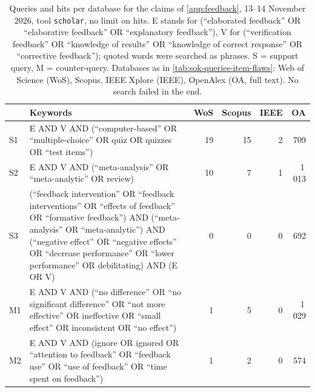 \begin{table}[htbp]
  \caption{Queries and hits per database for the claims of
    \cref{app:feedback}, 13--14 November 2026, tool \texttt{scholar}, no
    limit on hits.  E stands for (\enquote{elaborated feedback} OR
    \enquote{elaborative feedback} OR \enquote{explanatory feedback}),
    V for (\enquote{verification feedback} OR \enquote{knowledge of
    results} OR \enquote{knowledge of correct response} OR
    \enquote{corrective feedback}); quoted words were searched as
    phrases.  S = support query, M = counter-query.  Databases as in
    \cref{tab:sok-queries-item-flaws}: Web of Science (WoS), Scopus, IEEE
    Xplore (IEEE), OpenAlex (OA, full text).  No search failed in the
    end.}
  \label{tab:sok-queries-feedback}
  \centering\footnotesize
  \begin{tabularx}{\linewidth}{@{}l>{\raggedright\arraybackslash}X
    rrrr@{}}
    \toprule
       & Keywords & WoS & Scopus & IEEE & OA \\
    \midrule
    S1 & E AND V AND (\enquote{computer-based} OR \enquote{multiple-choice}
         OR quiz OR quizzes OR \enquote{test items})
       & 19 & 15 & 2 & 709 \\
    S2 & E AND V AND (\enquote{meta-analysis} OR \enquote{meta-analytic} OR
         review)
       & 10 & 7 & 1 & 1\,013 \\
    S3 & (\enquote{feedback intervention} OR \enquote{feedback
         interventions} OR \enquote{effects of feedback} OR
         \enquote{formative feedback}) AND (\enquote{meta-analysis} OR
         \enquote{meta-analytic}) AND (\enquote{negative effect} OR
         \enquote{negative effects} OR \enquote{decrease performance} OR
         \enquote{lower performance} OR debilitating) AND (E OR V)
       & 0 & 0 & 0 & 692 \\
    \midrule
    M1 & E AND V AND (\enquote{no difference} OR \enquote{no significant
         difference} OR \enquote{not more effective} OR ineffective OR
         \enquote{small effect} OR inconsistent OR \enquote{no effect})
       & 1 & 5 & 0 & 1\,029 \\
    M2 & E AND V AND (ignore OR ignored OR \enquote{attention to feedback}
         OR \enquote{feedback use} OR \enquote{use of feedback} OR
         \enquote{time spent on feedback})
       & 1 & 2 & 0 & 574 \\
    \bottomrule
  \end{tabularx}
\end{table}

